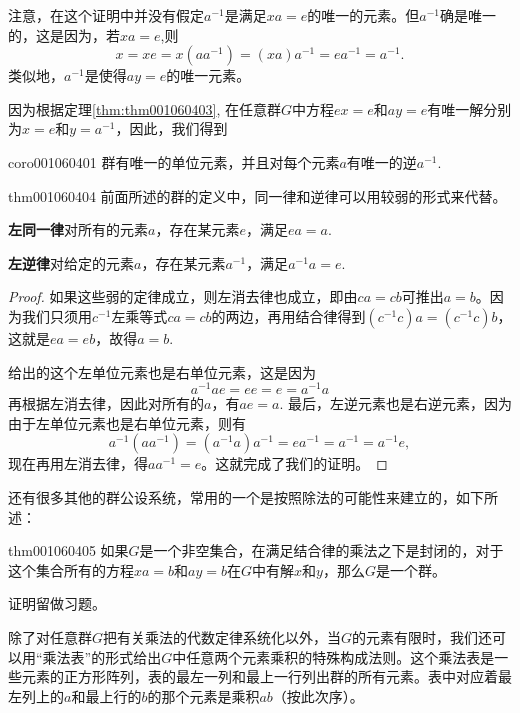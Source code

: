 注意，在这个证明中并没有假定$a^{-1}$是满足$xa=e$的唯一的元素。但$a^{-1}$确是唯一的，这是因为，若$xa=e$,则
\[
x=xe=x(aa^{-1})=(xa)a^{-1}=ea^{-1}=a^{-1}.
\]
类似地，$a^{-1}$是使得$ay=e$的唯一元素。

因为根据定理\ref{thm:thm001060403}, 在任意群$G$中方程$ex=e$和$ay=e$有唯一解分别为$x=e$和$y = a^{-1}$，因此，我们得到
\begin{corollary}{}{coro001060401}
群有唯一的单位元素，并且对每个元素$a$有唯一的逆$a^{-1}$.
\end{corollary}

\begin{theorem}{}{thm001060404}
前面所述的群的定义中，同一律和逆律可以用较弱的形式来代替。

\textbf{左同一律}\quad 对所有的元素$a$，存在某元素$e$，满足$ea = a$.

\textbf{左逆律}\quad 对给定的元素$a$，存在某元素$a^{-1}$，满足$a^{-1}a = e$.
\end{theorem}

\begin{proof}
如果这些弱的定律成立，则左消去律也成立，即由$ca = cb$可推出$a=b$。因为我们只须用$c^{-1}$左乘等式$ca=cb$的两边，再用结合律得到$(c^{-1}c)a = (c^{-1}c)b$，这就是$ea=eb$，故得$a=b$.

给出的这个左单位元素也是右单位元素，这是因为
\[
a^{-1}ae = ee = e = a^{-1}a
\]
再根据左消去律，因此对所有的$a$，有$ae=a$. 最后，左逆元素也是右逆元素，因为由于左单位元素也是右单位元素，则有
\[
a^{-1}(aa^{-1}) = (a^{-1}a)a^{-1} = ea^{-1}=a^{-1} = a^{-1}e,
\]
现在再用左消去律，得$aa^{-1}=e$。这就完成了我们的证明。
\end{proof}

还有很多其他的群公设系统，常用的一个是按照除法的可能性来建立的，如下所述：
\begin{theorem}{}{thm001060405}
如果$G$是一个非空集合，在满足结合律的乘法之下是封闭的，对于这个集合所有的方程$xa=b$和$ay=b$在$G$中有解$x$和$y$，那么$G$是一个群。
\end{theorem}

证明留做习题。

除了对任意群$G$把有关乘法的代数定律系统化以外，当$G$的元素有限时，我们还可以用“乘法表”的形式给出$G$中任意两个元素乘积的特殊构成法则。这个乘法表是一些元素的正方形阵列，表的最左一列和最上一行列出群的所有元素。表中对应着最左列上的$a$和最上行的$b$的那个元素是乘积$ab$（按此次序）。


